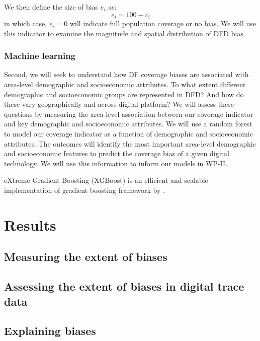 \documentclass[]{rsos}%
\begin{document}
We then define the size of bias \(e_i\) as:
\begin{equation}
e_i = 100 - c_i
\end{equation}
in which case, \(e_i = 0\) will indicate full population coverage or no bias. We will use this indicator to examine the magnitude and spatial distribution of DFD bias.

\subsubsection{Machine learning}\label{machine-learning}

Second, we will seek to understand how DF coverage biases are associated with area-level
demographic and socioeconomic attributes. To what extent different demographic and socioeconomic
groups are represented in DFD? And how do these vary geographically and across digital platform?
We will assess these questions by measuring the area-level association between our coverage
indicator and key demographic and socioeconomic attributes. We will use a random forest to model
our coverage indicator as a function of demographic and socioeconomic attributes. The outcomes will
identify the most important area-level demographic and socioeconomic features to predict the
coverage bias of a given digital technology. We will use this information to inform our models in WP-II.

eXtreme Gradient Boosting (XGBoost) is an efficient and scalable implementation of gradient boosting framework by \citep{friedman2001, friedman2000}.

\section{Results}\label{results}

\subsection{Measuring the extent of biases}\label{measuring-the-extent-of-biases}

\subsection{Assessing the extent of biases in digital trace data}\label{assessing-the-extent-of-biases-in-digital-trace-data}

\subsection{Explaining biases}\label{explaining-biases}
\end{document}
